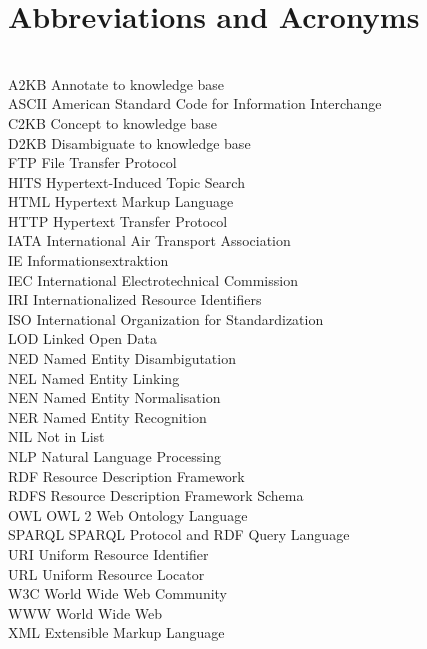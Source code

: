 \section{Abbreviations and Acronyms}
\label{akro}
\begin{tabbing}
\hspace*{3cm}\=  \\ \kill
A2KB     \> Annotate to knowledge base\\
ASCII    \> American Standard Code for Information Interchange\\
C2KB     \> Concept to knowledge base\\
D2KB     \> Disambiguate to knowledge base\\
FTP      \> File Transfer Protocol\\
HITS     \> Hypertext-Induced Topic Search\\
HTML     \> Hypertext Markup Language\\
HTTP     \> Hypertext Transfer Protocol\\
IATA     \> International Air Transport Association\\
IE       \> Informationsextraktion\\
IEC      \> International Electrotechnical Commission\\
IRI      \> Internationalized Resource Identifiers\\
ISO      \> International Organization for Standardization\\
LOD      \> Linked Open Data\\
NED      \> Named Entity Disambigutation\\
NEL      \> Named Entity Linking\\
NEN      \> Named Entity Normalisation\\
NER      \> Named Entity Recognition\\
NIL      \> Not in List\\
NLP      \> Natural Language Processing\\
RDF      \> Resource Description Framework\\
RDFS     \> Resource Description Framework Schema\\
OWL      \> OWL 2 Web Ontology Language\\
SPARQL   \> SPARQL Protocol and RDF Query Language\\
URI      \> Uniform Resource Identifier\\
URL      \> Uniform Resource Locator\\
W3C      \> World Wide Web Community\\
WWW      \> World Wide Web\\
XML      \> Extensible Markup Language\\
\end{tabbing}
\newpage
